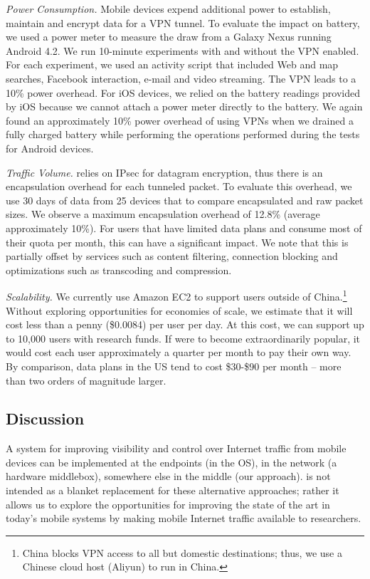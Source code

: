 \noindent\emph{Power Consumption.}
Mobile devices expend additional power to establish, maintain and encrypt data for a VPN tunnel. 
To evaluate the impact on battery, we used a power meter to measure the draw from a Galaxy Nexus running Android 4.2. 
We run 10-minute experiments with and without the VPN enabled. 
For each experiment, we used an activity script that included Web and map searches, Facebook interaction, e-mail and video
streaming. 
The VPN leads to a 10\% power overhead. 
For iOS devices, we relied on the battery readings provided by iOS because we cannot attach a power meter directly to the battery.
We again found an approximately 10\% power overhead of using VPNs when we drained a fully charged battery while performing the operations performed during the tests for Android devices.  

\noindent\emph{Traffic Volume.}
\meddle relies on IPsec for datagram encryption, thus there is an encapsulation overhead for each tunneled packet. 
To evaluate this overhead, we use 30 days of data from 25 devices that to compare encapsulated and raw packet sizes. 
We observe a maximum encapsulation overhead of 12.8\% (average approximately 10\%). 
For users that have limited data plans and consume most of their quota per month, this can have 
a significant impact. We note that this is partially offset by \meddle services such as content filtering, 
connection blocking and optimizations such as transcoding and compression. 

\noindent\emph{Scalability.} We currently use Amazon EC2 to support users outside of China.\footnote{China 
blocks VPN access to all but domestic destinations; thus, we use a Chinese cloud host (Aliyun) to run  
\meddle in China.} Without exploring opportunities for economies of scale, we estimate that 
it will cost less than a penny (\$0.0084) per user per day. At this cost, we can support up to 
10,000 users with research funds. If \meddle were to become extraordinarily popular, it would 
cost each user approximately a quarter per month to pay their own way. By comparison, 
data plans in the US tend to cost \$30-\$90 per month -- more than two orders of magnitude larger.


\subsection{Discussion}

 A system for improving visibility and control over Internet traffic from mobile 
devices can be implemented at the endpoints (\eg in the OS), in the network (\eg a hardware middlebox), 
somewhere else in the middle (our approach). \meddle is not intended as a blanket replacement for 
these alternative approaches; rather it allows us to explore the opportunities for improving the state of the 
art in today's mobile systems by making mobile Internet traffic available to researchers. 

